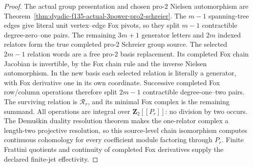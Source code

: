 \begin{proof}
The actual
group presentation
and chosen
pro-$2$
Nielsen
automorphism are
Theorem~\ref{thm:dyadic-f135-actual-3power-pro2-schreier}.
The $m-1$
spanning-tree
edges give
literal unit
vertex--edge
Fox pivots,
so they split
$m-1$
contractible
degree-zero--one
pairs.
The remaining
$3m+1$
generator
letters and
$2m$ indexed
relators form
the true
completed
pro-$2$
Schreier
group source.
The selected
$2m-1$
relation words
are a free
pro-$2$
basis replacement.
Its completed
Fox chain
Jacobian is
invertible,
by the Fox
chain rule
and the
inverse Nielsen
automorphism.
In the new
basis each
selected
relation is
literally a
generator,
with Fox
derivative one
in its own
coordinate.
Successive
completed
Fox row/column
operations
therefore split
$2m-1$
contractible
degree-one--two
pairs.
The surviving
relation is
$\mathscr R_r$,
and its
minimal
Fox complex
is the remaining
summand.
All operations
are integral
over
$\mathbf Z_2[[P_r]]$:
no division by
two occurs.
The Demu\v{s}kin
duality
resolution theorem
makes the
one-relator
complex a
length-two
projective
resolution,
so this
source-level
chain isomorphism
computes
continuous
cohomology
for every
coefficient
module
factoring through
$P_r$.
Finite
Frattini
quotients
and continuity
of completed
Fox derivatives
supply the
declared
finite-jet
effectivity.
\end{proof}

